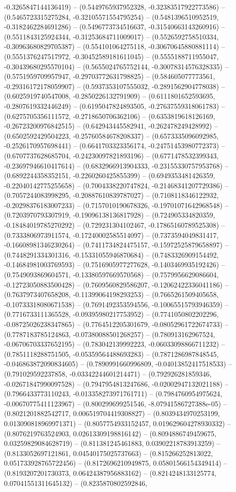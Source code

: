 -0.3265847144136419) -- (0.5449765937952328, -0.32383517922773586) -- (0.5465723315275284, -0.32105571554795254) -- (0.5481396510952519, -0.3182462284691286) -- (0.5496773734516637, -0.31540663143260916) -- (0.5511843125924344, -0.31253684711009017) -- (0.5526592758510334, -0.30963680829705387) -- (0.554101064275118, -0.30670645880881114) -- (0.5551376247517972, -0.30452589181611045) -- (0.5555188711955047, -0.30439680295570104) -- (0.5655024765752144, -0.30078314576328335) -- (0.5751959709957947, -0.29703772631798825) -- (0.584605077773561, -0.29316172178059907) -- (0.5937353107555032, -0.2891562904778038) -- (0.6025919740547008, -0.2850226132791909) -- (0.6111801652593695, -0.2807619332446249) -- (0.6195047824893505, -0.27637559318061783) -- (0.6275705356111572, -0.2718650706362106) -- (0.6353819618126169, -0.26723200976842515) -- (0.642943445582941, -0.262478249428992) -- (0.6502592429504223, -0.25760584678208337) -- (0.6573335096092985, -0.2526170957698441) -- (0.6641703323356174, -0.24751453980772373) -- (0.6707737628685704, -0.24230097821893196) -- (0.6771478532399343, -0.23697946610417614) -- (0.6832966913904333, -0.23155330757953768) -- (0.6892244358352151, -0.2260260425855399) -- (0.6949353481426359, -0.22040142775255658) -- (0.7004338220747824, -0.21468341207729386) -- (0.7057244083998295, -0.20887610839787027) -- (0.7108118346122932, -0.20298376183007233) -- (0.7157010190678326, -0.19701071642968548) -- (0.7203970793307919, -0.19096138136817928) -- (0.724905334820359, -0.18484019785270292) -- (0.729231304102467, -0.17865160789525308) -- (0.7333806973911574, -0.17240002585514097) -- (0.7373594049831417, -0.16608981346230264) -- (0.7411734824475157, -0.15972525879658897) -- (0.7448291334301316, -0.15331055946870684) -- (0.7483326909154492, -0.14684981003769593) -- (0.7516905977277628, -0.1403469935192426) -- (0.7549093869604571, -0.13380597669570568) -- (0.7579956629086604, -0.12723050883500428) -- (0.7609560829586207, -0.12062422336041186) -- (0.7637973407658208, -0.11399064198293253) -- (0.7665261509405658, -0.10733318080671538) -- (0.7691492353594556, -0.10065515793946359) -- (0.7716733111365528, -0.09395980217753952) -- (0.7741050802202296, -0.08725026238347865) -- (0.7764512205301679, -0.08052961722674733) -- (0.7787183785124863, -0.07380088501268257) -- (0.780913162967524, -0.06706703337652195) -- (0.783042139992223, -0.06033098866711232) -- (0.7851118288751505, -0.05359564488693283) -- (0.7871286987848545, -0.046863872090834605) -- (0.7890991660996809, -0.04013852417518533) -- (0.791029592237858, -0.03342244601214471) -- (0.792926281859346, -0.02671847990097528) -- (0.7947954813247686, -0.02002947132021188) -- (0.7966433773110243, -0.013358273971761711) -- (0.7984760954975624, -0.00670775411123967) -- (0.800299699251546, -8.07941586727388e-05) -- (0.8021201882542717, 0.006519704419308827) -- (0.8039434970253199, 0.013090818969971371) -- (0.8057754933152457, 0.019629604278930332) -- (0.8076219763524903, 0.02613309198816142) -- (0.8094886749459675, 0.03259829084628719) -- (0.811381245461883, 0.03902218783913259) -- (0.8133052697121861, 0.04540175025737663) -- (0.815266252813022, 0.051733928765722456) -- (0.8172696210949875, 0.05801566154349414) -- (0.8193207201730373, 0.06424387956883162) -- (0.8214248133125774, 0.07041551311645132) -- (0.8235870802592846, 